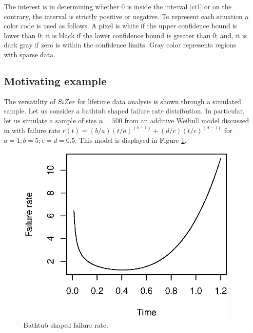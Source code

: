 \documentclass[preprint,12pt]{elsarticle}
\begin{document}
The interest is in determining whether 0 is inside the interval \eqref{ci1} or on the contrary, the interval is strictly positive or negative. To represent each situation a color code is used as follows. A pixel is white if the upper confidence bound is lower than 0; it is black if the lower confidence  bound is greater than 0; and, it is  dark gray if zero is within the confidence limits. Gray color  represents regions with sparse data.

\subsection{Motivating example}
The versatility of $SiZer$ for lifetime data analysis is shown through a simulated sample. Let us consider a bathtub shaped failure rate distribution. In particular, let us simulate a sample of size $n=500$ from an additive Weibull model discussed in \cite{XieLai96} with failure rate $r(t)=(b/a)(t/a)^{(b-1)}+(d/c)(t/c)^{(d-1)}$ for $a=1;b=5;c=d=0.5$. This model is displayed in Figure \ref{Fig:simulatedhazard}.

\begin{figure}[htb]
\begin{center}
\includegraphics[height=9cm]{Fig1_motivatinghazard}%
\caption{Bathtub shaped failure rate.}\label{Fig:simulatedhazard}
\end{center}
\end{figure}
\end{document}
